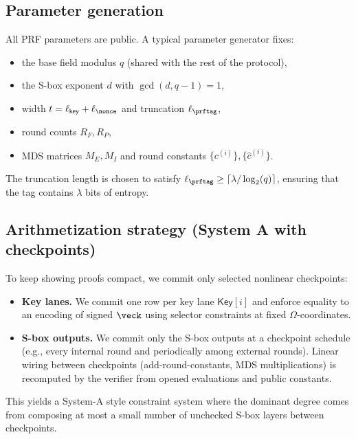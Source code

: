 \subsection{Parameter generation}
All PRF parameters are public. A typical parameter generator fixes:
\begin{itemize}[leftmargin=1.25em]
  \item the base field modulus \(q\) (shared with the rest of the protocol),
  \item the S-box exponent \(d\) with \(\gcd(d,q-1)=1\),
  \item width \(t=\ell_{\mathsf{key}}+\ell_{\nonce}\) and truncation \(\ell_{\prftag}\),
  \item round counts \(R_F,R_P\),
  \item MDS matrices \(M_E,M_I\) and round constants \(\{c^{(i)}\},\{\hat c^{(i)}\}\).
\end{itemize}
The truncation length is chosen to satisfy \(\ell_{\prftag}\ge \lceil \lambda/\log_2(q)\rceil\), ensuring that the
tag contains \(\lambda\) bits of entropy.

\subsection{Arithmetization strategy (System A with checkpoints)}
To keep showing proofs compact, we commit only selected nonlinear checkpoints:
\begin{itemize}[leftmargin=1.25em]
  \item \textbf{Key lanes.} We commit one row per key lane \(\mathsf{Key}[i]\) and enforce equality to an encoding of
  signed \(\veck\) using selector constraints at fixed \(\Omega\)-coordinates.
  \item \textbf{S-box outputs.} We commit only the S-box outputs at a checkpoint schedule (e.g., every internal round and
  periodically among external rounds). Linear wiring between checkpoints (add-round-constants, MDS multiplications) is
  recomputed by the verifier from opened evaluations and public constants.
\end{itemize}
This yields a System-A style constraint system where the dominant degree comes from composing at most a small number of
unchecked S-box layers between checkpoints.
